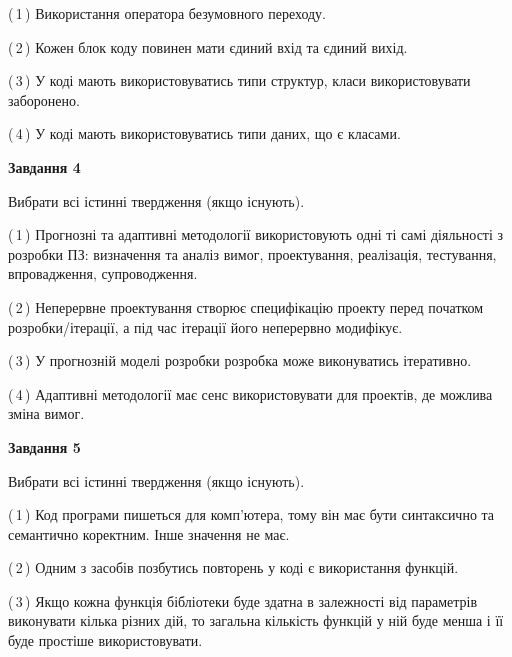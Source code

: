 \documentclass[10pt, ukrainian]{article}
\begin{document}
{\begin {large}
(\,1\,) Використання оператора безумовного переходу. %



(\,2\,) Кожен блок коду повинен мати єдиний вхід та єдиний вихід.%



(\,3\,) У коді мають використовуватись типи структур, класи використовувати заборонено. %



(\,4\,) У коді мають використовуватись типи даних, що є класами. %


{\begin {center}\textbf{Завдання 4}\end {center}}\par
Вибрати всі істинні твердження (якщо існують).\par
\vspace{2mm}



(\,1\,) Прогнозні та адаптивні методології використовують одні ті самі діяльності з розробки ПЗ: визначення та аналіз вимог, проектування, реалізація, тестування, впровадження, супроводження. %



(\,2\,) Неперервне проектування створює специфікацію проекту перед початком розробки/ітерації, а під час ітерації його неперервно модифікує.%



(\,3\,) У прогнозній моделі розробки розробка може виконуватись ітеративно. %



(\,4\,) Адаптивні методології має сенс використовувати для проектів, де можлива зміна вимог. %


{\begin {center}\textbf{Завдання 5}\end {center}}\par
Вибрати всі істинні твердження (якщо існують).\par
\vspace{2mm}



(\,1\,) Код програми пишеться для комп'ютера, тому він має бути синтаксично та семантично коректним. Інше значення не має. %



(\,2\,) Одним з засобів позбутись повторень у коді є використання функцій. %



(\,3\,) Якщо кожна функція бібліотеки буде здатна в залежності від параметрів виконувати кілька різних дій, то загальна кількість функцій у ній буде менша і її буде простіше використовувати. %




\end{large}}
\end{document}
